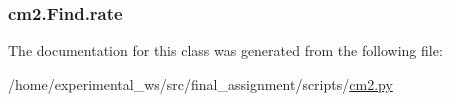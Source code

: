 \subsubsection[{\texorpdfstring{rate}{rate}}]{\setlength{\rightskip}{0pt plus 5cm}cm2.\+Find.\+rate\hspace{0.3cm}{\ttfamily [static]}}\hypertarget{classcm2_1_1Find_a7d73b556208fcf41081fb23ae0e1b262}{}\label{classcm2_1_1Find_a7d73b556208fcf41081fb23ae0e1b262}


The documentation for this class was generated from the following file\+:\begin{DoxyCompactItemize}
\item 
/home/experimental\+\_\+ws/src/final\+\_\+assignment/scripts/\hyperlink{cm2_8py}{cm2.\+py}\end{DoxyCompactItemize}
